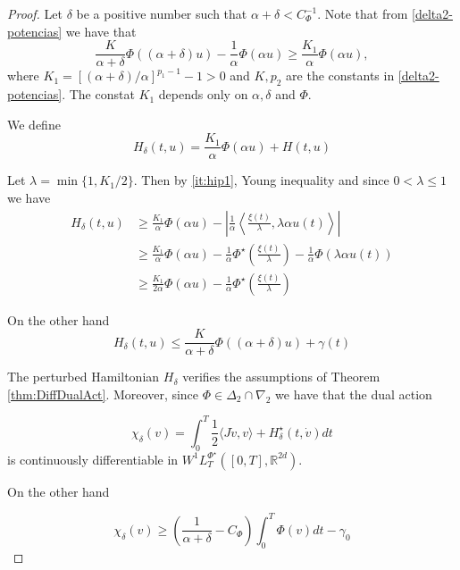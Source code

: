 \documentclass[twoside]{article}
\theoremstyle{remark}
\newcommand{\lpsi}{L^{\Phi^{\star}}}
\newcommand{\rr}{\mathbb{R}}
\renewcommand{\leq}{\leqslant}
\renewcommand{\geq}{\geqslant}
\newcommand{\Phie}{\Phi^{\star}}
\begin{document}
\begin{proof} Let $\delta$ be a positive number such that $\alpha+\delta<C_{\Phi}^{-1}$. Note that from  \eqref{delta2-potencias}  we have that
\[\frac{K}{\alpha+\delta}\Phi\left( (\alpha+\delta) u\right)-
  \frac{1}{\alpha}\Phi\left( \alpha u\right)\geq  \frac{K_1}{\alpha}\Phi\left( \alpha u\right), \]
where $K_1=\left[ (\alpha+\delta)/\alpha\right]^{p_1-1}-1>0$ and $K, p_2$ are the constants in \eqref{delta2-potencias}. The constat $K_1$  depends only on $\alpha,\delta$ and $\Phi$. 


We define
\[
  H_{\delta}(t,u)= \frac{K_1}{\alpha}\Phi\left( \alpha u\right)+H(t,u)
\]
 

Let $\lambda=\min\{1,K_1/2\}$. Then by \ref{it:hip1}, Young inequality and since $0<\lambda\leq 1$ we have
\begin{equation}\label{eq:CotaSupH}
 \begin{split}
    H_{\delta}(t,u)  &\geq  \frac{K_1}{\alpha}\Phi\left( \alpha u\right)-\left| \frac{1}{\alpha} \left\langle \frac{\xi(t)}{\lambda}, \lambda\alpha u(t)\right\rangle \right|  \\
    &\geq  \frac{K_1}{\alpha}\Phi\left( \alpha u\right)- \frac{1}{\alpha} \Phie\left(\frac{\xi(t)}{\lambda}\right) -\frac{1}{\alpha}\Phi\left( \lambda\alpha u(t)\right)  \\
    &\geq  \frac{K_1}{2\alpha}\Phi\left( \alpha u\right)- \frac{1}{\alpha} \Phie\left(\frac{\xi(t)}{\lambda}\right)
  \end{split} 
\end{equation}

On the other hand
\begin{equation}\label{eq:CotaInfH}
  H_{\delta}(t,u)  \leq  \frac{K}{\alpha+\delta}\Phi\left( (\alpha+\delta) u\right)+\gamma(t)
\end{equation}


The perturbed Hamiltonian $H_{\delta}$ verifies the assumptions of Theorem \ref{thm:DiffDualAct}. Moreover, since $\Phi\in\Delta_2\cap \nabla_2$ we have that the dual action

\begin{equation}\label{eq:DualActDelta}
 \chi_{\delta}(v)=\int_0^T \frac{1}{2} \langle J\dot{v},v\rangle+H_{\delta}^{\star}(t,\dot{v})  dt
\end{equation}
is continuously differentiable in $ W^1\lpsi_T([0,T],\rr^{2d})$. 

On the other hand

\[
  \chi_{\delta}(v)\geq \left(\frac{1}{\alpha+\delta}-C_{\Phi} \right) \int_0^T\Phi(v)dt-\gamma_0
\]


\end{proof}
\end{document}
